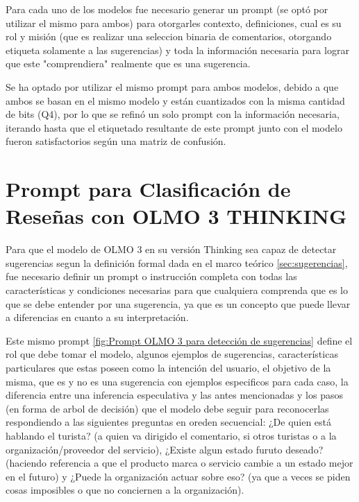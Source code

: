 Para cada uno de los modelos fue necesario generar un prompt (se optó por utilizar el mismo para ambos) para otorgarles contexto, definiciones, cual es su rol y misión (que es realizar una seleccion binaria de comentarios, otorgando etiqueta solamente a las sugerencias) y toda la información necesaria para lograr que este "comprendiera" realmente que es una sugerencia.

Se ha optado por utilizar el mismo prompt para ambos modelos, debido a que ambos se basan en el mismo modelo y están cuantizados con la misma cantidad de bits (Q4), por lo que se refinó un solo prompt con la información necesaria, iterando hasta que el etiquetado resultante de este prompt junto con el modelo fueron satisfactorios según una matriz de confusión.

\section{Prompt para Clasificación de Reseñas con OLMO 3 THINKING}
\label{sec:Prompt OLMO 3 para detección de sugerencias}

Para que el modelo de OLMO 3 en su versión Thinking sea capaz de detectar sugerencias segun la definición formal dada en el marco teórico \ref{sec:sugerencias}, fue necesario definir un prompt o instrucción completa con todas las características y condiciones necesarias para que cualquiera comprenda que es lo que se debe entender por una sugerencia, ya que es un concepto que puede llevar a diferencias en cuanto a su interpretación.

Este mismo prompt \ref{fig:Prompt OLMO 3 para detección de sugerencias} define el rol que debe tomar el modelo, algunos ejemplos de sugerencias, características particulares que estas poseen como la intención del usuario, el objetivo de la misma, que es y no es una sugerencia con ejemplos especificos para cada caso, la diferencia entre una inferencia especulativa y las antes mencionadas y los pasos (en forma de arbol de decisión) que el modelo debe seguir para reconocerlas respondiendo a las siguientes preguntas en oreden secuencial: ¿De quien está hablando el turista? (a quien va dirigido el comentario, si otros turistas o a la organización/proveedor del servicio), ¿Existe algun estado furuto deseado? (haciendo referencia a que el producto marca o servicio cambie a un estado mejor en el futuro) y ¿Puede la organización actuar sobre eso? (ya que a veces se piden cosas imposibles o que no conciernen a la organización).


